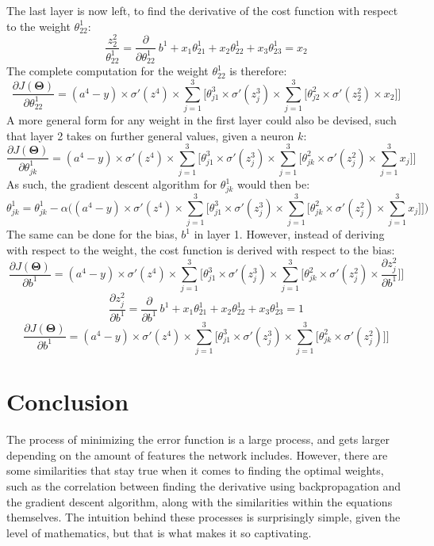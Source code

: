\documentclass[a4paper,12pt]{article}
\begin{document}
The last layer is now left, to find the derivative of the cost function with respect to the weight $\theta_{22}^1$:
\[\frac{z^2_2}{\theta_{22}^1} = \frac{\partial}{\partial \theta_{22}^1} \ b^1 + x_1\theta_{21}^1 + x_2\theta_{22}^1 + x_3\theta^1_{23} = x_2\]
The complete computation for the weight $\theta_{22}^1$ is therefore: 
\[\frac{\partial J(\boldsymbol{\Theta})}{\partial \theta^1_{22}} = (a^4 - y) \times \sigma'(z^4) \times \sum_{j=1}^3 \Big[\theta^3_{j1} \times \sigma'(z^3_j) \times \sum_{j=1}^{3} \Big[ \theta^2_{j2} \times \sigma'(z^2_2) \times x_2\Big]\Big]\]
A more general form for any weight in the first layer could also be devised, such that layer 2 takes on further general values, given a neuron $k$:
\[\frac{\partial J(\boldsymbol{\Theta})}{\partial \theta^1_{jk}} = (a^4 - y) \times \sigma'(z^4) \times \sum_{j=1}^3 \Big[\theta^3_{j1} \times \sigma'(z^3_j) \times \sum_{j=1}^{3} \Big[ \theta^2_{jk} \times \sigma'(z^2_j) \times \sum_{j=1}^3x_j\Big]\Big]\]
As such, the gradient descent algorithm for $\theta_{jk}^1$ would then be:
\[\theta_{jk}^1 = \theta_{jk}^1 - \alpha\Big((a^4 - y) \times \sigma'(z^4) \times \sum_{j=1}^3 \Big[\theta^3_{j1} \times \sigma'(z^3_j) \times \sum_{j=1}^{3} \Big[ \theta^2_{jk} \times \sigma'(z^2_j) \times \sum_{j=1}^3x_j\Big]\Big]\Big)\]
The same can be done for the bias, $b^1$ in layer 1. However, instead of deriving with respect to the weight, the cost function is derived with respect to the bias:
\[\frac{\partial J(\boldsymbol{\Theta})}{\partial b^1} = (a^4 - y) \times \sigma'(z^4) \times \sum_{j=1}^3 \Big[\theta^3_{j1} \times \sigma'(z^3_j) \times \sum_{j=1}^{3} \Big[ \theta^2_{jk} \times \sigma'(z^2_j) \times \frac{\partial z^2_j}{\partial b^1}\Big]\Big]\]
\[\frac{\partial z^2_j}{\partial b^1} = \frac{\partial}{\partial b^1} \ b^1 + x_1\theta_{21}^1 + x_2\theta_{22}^1 + x_3\theta^1_{23} = 1\]
\[\frac{\partial J(\boldsymbol{\Theta})}{\partial b^1} = (a^4 - y) \times \sigma'(z^4) \times \sum_{j=1}^3 \Big[\theta^3_{j1} \times \sigma'(z^3_j) \times \sum_{j=1}^{3} \Big[ \theta^2_{jk} \times \sigma'(z^2_j)\Big]\Big]\]

\section{Conclusion}
The process of minimizing the error function is a large process, and gets larger depending on the amount of features the network includes. However, there are some similarities that stay true when it comes to finding the optimal weights, such as the correlation between finding the derivative using backpropagation and the gradient descent algorithm, along with the similarities within the equations themselves. The intuition behind these processes is surprisingly simple, given the level of mathematics, but that is what makes it so captivating.
\end{document}
